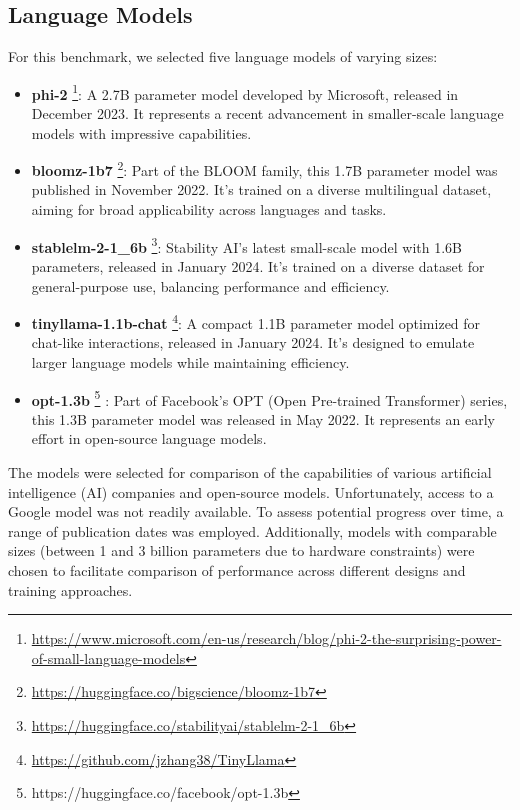 \documentclass[12pt,a4paper]{article}
\begin{document}
	\subsection{Language Models}
	For this benchmark, we selected five language models of varying sizes:
	\begin{itemize}
		\item \textbf{phi-2} \footnote{\url{https://www.microsoft.com/en-us/research/blog/phi-2-the-surprising-power-of-small-language-models}}: A 2.7B parameter model developed by Microsoft, released in December 2023. It represents a recent advancement in smaller-scale language models with impressive capabilities.
	
	\item \textbf{bloomz-1b7} \footnote{\url{https://huggingface.co/bigscience/bloomz-1b7}}: Part of the BLOOM family, this 1.7B parameter model was published in November 2022. It's trained on a diverse multilingual dataset, aiming for broad applicability across languages and tasks.
	
	\item \textbf{stablelm-2-1\_6b} \footnote{\url{https://huggingface.co/stabilityai/stablelm-2-1_6b}}: Stability AI's latest small-scale model with 1.6B parameters, released in January 2024. It's trained on a diverse dataset for general-purpose use, balancing performance and efficiency.
	
	\item \textbf{tinyllama-1.1b-chat} \footnote{\url{https://github.com/jzhang38/TinyLlama}}: A compact 1.1B parameter model optimized for chat-like interactions, released in January 2024. It's designed to emulate larger language models while maintaining efficiency.
	
	\item \textbf{opt-1.3b} \footnote{https://huggingface.co/facebook/opt-1.3b} \cite{zhang2022optopenpretrainedtransformer}: Part of Facebook's OPT (Open Pre-trained Transformer) series, this 1.3B parameter model was released in May 2022. It represents an early effort in open-source language models.
	\end{itemize}
	
	The models were selected for comparison of the capabilities of various artificial intelligence (AI) companies and open-source models. Unfortunately, access to a Google model was not readily available. To assess potential progress over time, a range of publication dates was employed. Additionally, models with comparable sizes (between 1 and 3 billion parameters due to hardware constraints) were chosen to facilitate comparison of performance across different designs and training approaches.
	
\end{document}
